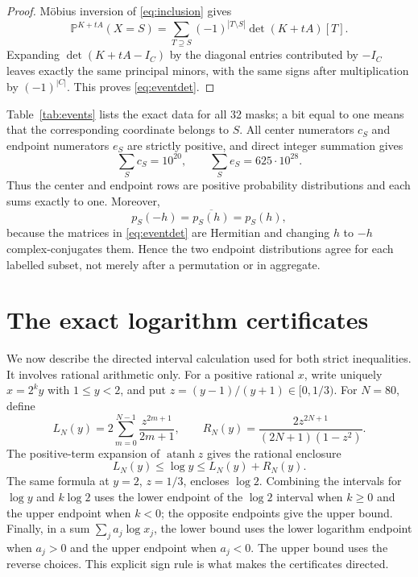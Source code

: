\documentclass[11pt]{article}
\newcommand{\PP}{\mathbb P}
\begin{document}
\begin{proof}
M\"obius inversion of \eqref{eq:inclusion} gives
\begin{equation}\label{eq:mobius}
 \PP^{K+tA}(X=S)=
 \sum_{T\supseteq S}(-1)^{|T\setminus S|}\det(K+tA)[T].
\end{equation}
Expanding $\det(K+tA-I_C)$ by the diagonal entries contributed by $-I_C$
leaves exactly the same principal minors, with the same signs after multiplication
by $(-1)^{|C|}$.  This proves \eqref{eq:eventdet}.
\end{proof}

Table~\ref{tab:events} lists the exact data for all 32 masks; a bit equal to one
means that the corresponding coordinate belongs to $S$.  All center numerators
$c_S$ and endpoint numerators $e_S$ are strictly positive, and direct integer
summation gives
\begin{equation}\label{eq:sums}
 \sum_Sc_S=10^{20},
 \qquad
 \sum_Se_S=625\cdot10^{28}.
\end{equation}
Thus the center and endpoint rows are positive probability distributions and each
sums exactly to one.  Moreover,
\[
 p_S(-h)=\overline{p_S(h)}=p_S(h),
\]
because the matrices in \eqref{eq:eventdet} are Hermitian and changing $h$ to
$-h$ complex-conjugates them.  Hence the two endpoint distributions agree for
each labelled subset, not merely after a permutation or in aggregate.

\section{The exact logarithm certificates}

We now describe the directed interval calculation used for both strict
inequalities.  It involves rational arithmetic only.  For a positive rational
$x$, write uniquely $x=2^k y$ with $1\le y<2$, and put
$z=(y-1)/(y+1)\in[0,1/3)$.  For $N=80$, define
\[
 L_N(y)=2\sum_{m=0}^{N-1}\frac{z^{2m+1}}{2m+1},
 \qquad
 R_N(y)=\frac{2z^{2N+1}}{(2N+1)(1-z^2)}.
\]
The positive-term expansion of $\operatorname{atanh}z$ gives the rational
enclosure
\begin{equation}\label{eq:loginterval}
 L_N(y)\le\log y\le L_N(y)+R_N(y).
\end{equation}
The same formula at $y=2$, $z=1/3$, encloses $\log2$.  Combining the intervals
for $\log y$ and $k\log2$ uses the lower endpoint of the $\log2$ interval when
$k\ge0$ and the upper endpoint when $k<0$; the opposite endpoints give the upper
bound.  Finally, in a sum $\sum_j a_j\log x_j$, the lower bound uses the lower
logarithm endpoint when $a_j>0$ and the upper endpoint when $a_j<0$.  The upper
bound uses the reverse choices.  This explicit sign rule is what makes the
certificates directed.
\end{document}
